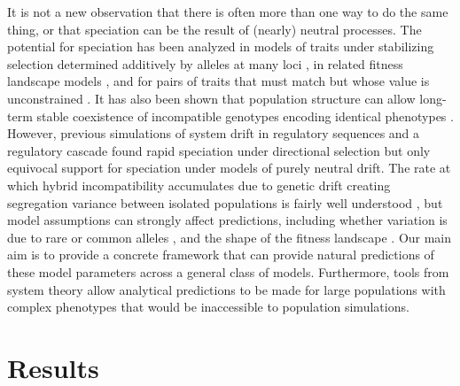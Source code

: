 \documentclass{article}
\newcommand{\1}{\mathbbm{1}}
\begin{document}
It is not a new observation that there is often more than one way to do the same thing, 
or that speciation can be the result of (nearly) neutral processes.
The potential for speciation has been analyzed in models of 
traits under stabilizing selection determined additively by alleles at many loci 
\citep{wright1935evolution,barton1986maintenance,barton1989divergence,barton2001role},
in related fitness landscape models \citep{fraisse2016genetics},
and for pairs of traits that must match but whose value is unconstrained \citep{sved1981twosex}.
It has also been shown that population structure
can allow long-term stable coexistence of incompatible genotypes encoding identical phenotypes \citep{phillips1996maintenance}.
However, previous simulations of system drift in regulatory sequences \citep{tulchinsky2014hybrid}
and a regulatory cascade \citep{porter2002speciation}
found rapid speciation under directional selection
but only equivocal support for speciation under models of purely neutral drift.
The rate at which hybrid incompatibility accumulates due to genetic drift creating
segregation variance between isolated populations is fairly well understood
\citep{slatkin1994segregation,rosas2010cryptic,chevin2014niche},
but model assumptions can strongly affect predictions,
including whether variation is due to rare or common alleles \citep{slatkin1994segregation},
and the shape of the fitness landscape \citep{fraisse2016genetics}.
Our main aim is to provide a concrete framework 
that can provide natural predictions of these model parameters
across a general class of models.
Furthermore, tools from system theory allow analytical predictions to be made
for large populations with complex phenotypes
that would be inaccessible to population simulations.


\section*{Results}
\end{document}
